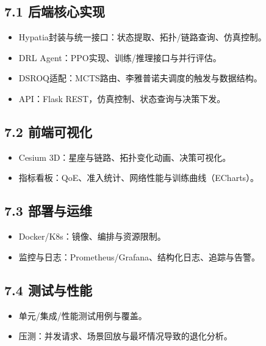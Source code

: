 \subsection{7.1
后端核心实现}\label{ux540eux7aefux6838ux5fc3ux5b9eux73b0}

\begin{itemize}
\tightlist
\item
  Hypatia封装与统一接口：状态提取、拓扑/链路查询、仿真控制。
\item
  DRL Agent：PPO实现、训练/推理接口与并行评估。
\item
  DSROQ适配：MCTS路由、李雅普诺夫调度的触发与数据结构。
\item
  API：Flask REST，仿真控制、状态查询与决策下发。
\end{itemize}

\subsection{7.2 前端可视化}\label{ux524dux7aefux53efux89c6ux5316}

\begin{itemize}
\tightlist
\item
  Cesium 3D：星座与链路、拓扑变化动画、决策可视化。
\item
  指标看板：QoE、准入统计、网络性能与训练曲线（ECharts）。
\end{itemize}

\subsection{7.3 部署与运维}\label{ux90e8ux7f72ux4e0eux8fd0ux7ef4}

\begin{itemize}
\tightlist
\item
  Docker/K8s：镜像、编排与资源限制。
\item
  监控与日志：Prometheus/Grafana、结构化日志、追踪与告警。
\end{itemize}

\subsection{7.4 测试与性能}\label{ux6d4bux8bd5ux4e0eux6027ux80fd}

\begin{itemize}
\tightlist
\item
  单元/集成/性能测试用例与覆盖。
\item
  压测：并发请求、场景回放与最坏情况导致的退化分析。
\end{itemize}


